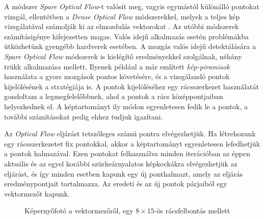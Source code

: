 A módszer \textit{Spare Optical Flow}-t valósít meg, vagyis egymástól különálló pontokat vizsgál, ellentétben a \textit{Dense Optical Flow} módszerekkel, melyek a teljes kép vizsgálatával számolják ki az elmozdulás vektorokat \cite{bradski2008learning}. Az utóbbi módszerek számításigénye kifejezetten magas. Valós idejű alkalmazás esetén problémákba ütközhetünk gyengébb hardverek esetében. A mozgás valós idejű detektálására a \textit{Spare Optical Flow} módszerek is kielégítő eredményekkel szolgálnak, néhány trükk alkalmazása mellett. Ilyenek például a már említett \textit{kép-piramisok} használata a gyors mozgások pontos követésére, és a vizsgálandó pontok kijelölésének a stratégiája is. A pontok kijelöléséhez egy rácsszerkezet használatát gondoltam a legmegfelelőbbnek, ahol a pontok a rács középpontjaiban helyezkednek el. A képtartományt ily módon egyenletesen fedik le a pontok, a további számításokat pedig ehhez tudjuk igazítani.


Az \textit{Optical Flow} eljárást tetszőleges számú pontra elvégezhetjük. Ha létrehozunk egy rácsszerkezetet fix pontokkal, akkor a képtartományt egyenletesen lefedhetjük a pontok halmazával.
Ezen pontokat felhasználva minden iterációban az éppen aktuális és az egyel korábbi szürkeárnyalatos képkockákra elvégezhetjük az eljárást, és így minden esetben kapunk egy új ponthalmazt, amely az eljárás eredménypontjait tartalmazza. Az eredeti és az új pontok párjaiból egy vektormezőt kapunk.

\begin{figure}[h]
\centering
{}
\caption{Képernyőfotó a vektormezőről, egy $8 \times 15$-ös rácsfelbontás mellett}
\label{fig:vectorfield}
\end{figure}

